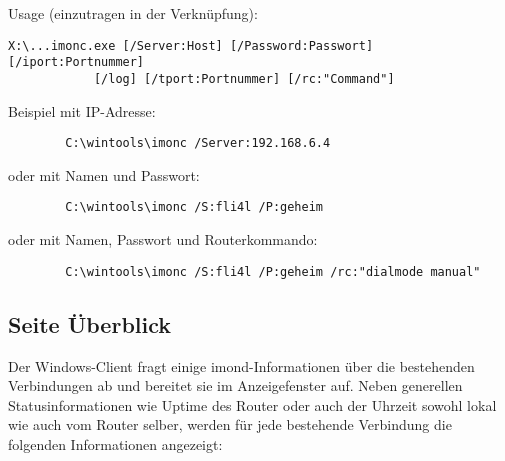   Usage (einzutragen in der Verknüpfung):

\begin{example}
\begin{verbatim}
X:\...imonc.exe [/Server:Host] [/Password:Passwort] [/iport:Portnummer]
            [/log] [/tport:Portnummer] [/rc:"Command"]
\end{verbatim}
\end{example}

  Beispiel mit IP-Adresse:

\begin{example}
\begin{verbatim}
        C:\wintools\imonc /Server:192.168.6.4
\end{verbatim}
\end{example}

  oder mit Namen und Passwort:

\begin{example}
\begin{verbatim}
        C:\wintools\imonc /S:fli4l /P:geheim
\end{verbatim}
\end{example}

  oder mit Namen, Passwort und Routerkommando:

\begin{example}
\begin{verbatim}
        C:\wintools\imonc /S:fli4l /P:geheim /rc:"dialmode manual"
\end{verbatim}
\end{example}

  \subsection{Seite Überblick}

  Der Windows-Client fragt einige imond-Informationen über die bestehenden 
  Verbindungen ab und bereitet sie im Anzeigefenster auf. Neben generellen 
  Statusinformationen wie Uptime des Router oder auch der Uhrzeit sowohl lokal 
  wie auch vom Router selber, werden für jede bestehende Verbindung die 
  folgenden Informationen angezeigt:
  
